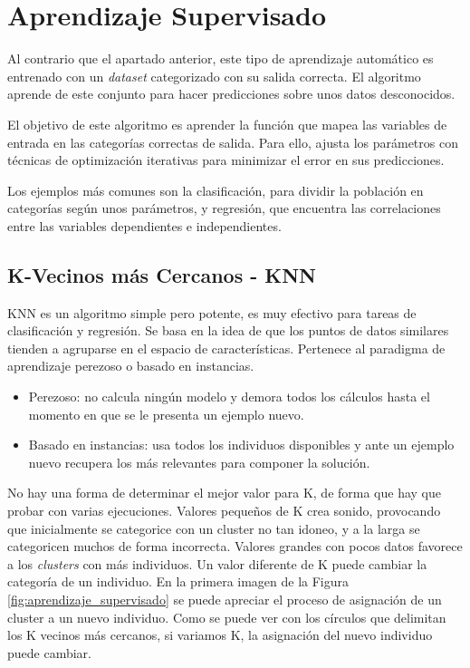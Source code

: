 \section{Aprendizaje Supervisado}
	Al contrario que el apartado anterior, este tipo de aprendizaje automático es entrenado con un \textit{dataset} categorizado con su salida correcta. El algoritmo aprende de este conjunto para hacer predicciones sobre unos datos desconocidos.
	
	El objetivo de este algoritmo es aprender la función que mapea las variables de entrada en las categorías correctas de salida. Para ello, ajusta los parámetros con técnicas de optimización iterativas para minimizar el error en sus predicciones.
	
	Los ejemplos más comunes son la clasificación, para dividir la población en categorías según unos parámetros, y regresión, que encuentra las correlaciones entre las variables dependientes e independientes.


	\subsection{K-Vecinos más Cercanos - KNN}

		KNN es un algoritmo simple pero potente, es muy efectivo para tareas de clasificación y regresión. Se basa en la idea de que los puntos de datos similares tienden a agruparse en el espacio de características. Pertenece al paradigma de aprendizaje perezoso o basado en instancias.
		
		\begin{itemize}
			\item Perezoso: no calcula ningún modelo y demora todos los cálculos hasta el momento en que se le presenta un ejemplo nuevo.			
			\item Basado en instancias: usa todos los individuos disponibles y ante un ejemplo nuevo recupera los más relevantes para componer la solución.	
		\end{itemize}
		
		No hay una forma de determinar el mejor valor para K, de forma que hay que probar con varias ejecuciones. Valores pequeños de K crea sonido, provocando que inicialmente se categorice con un cluster no tan idoneo, y a la larga se categoricen muchos de forma incorrecta. Valores grandes con pocos datos favorece a los \textit{clusters} con más individuos. Un valor diferente de K puede cambiar la categoría de un individuo. En la primera imagen de la Figura \ref{fig:aprendizaje_supervisado} se puede apreciar el proceso de asignación de un cluster a un nuevo individuo. Como se puede ver con los círculos que delimitan los K vecinos más cercanos, si variamos K, la asignación del nuevo individuo puede cambiar.

